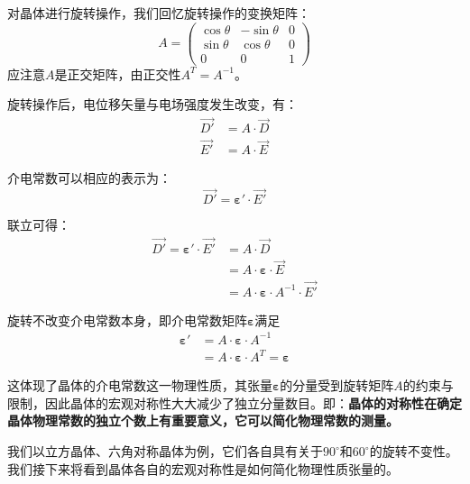     对晶体进行旋转操作，我们回忆旋转操作的变换矩阵：
    \[
    A=
    \left(
    \begin{array}{ccc}
        \cos\theta & -\sin\theta & 0 \\
        \sin\theta & \cos\theta  & 0 \\
        0          & 0           & 1 
    \end{array}
    \right)
    \]
    应注意$A$是正交矩阵，由正交性$A^T=A^{-1}$。

    旋转操作后，电位移矢量与电场强度发生改变，有：
    \begin{align*}
        \vec{D'} &= A \cdot \vec{D}\\
        \vec{E'} &= A \cdot \vec{E}
    \end{align*}

    介电常数可以相应的表示为：
    \[
    \vec{D'} = \boldsymbol{\varepsilon'} \cdot \vec{E'}
    \]

    联立可得：
    \begin{align*}
        \vec{D'}= \boldsymbol{\varepsilon'} \cdot \vec{E'}&= A \cdot \vec{D}\\
                                                          &= A \cdot \boldsymbol{\varepsilon} \cdot \vec{E}\\
                                                          &= A \cdot \boldsymbol{\varepsilon} \cdot A^{-1} \cdot \vec{E'}
    \end{align*}

    旋转不改变介电常数本身，即介电常数矩阵$\boldsymbol{\varepsilon}$满足
    \begin{align*}
        \boldsymbol{\varepsilon'} &= A \cdot \boldsymbol{\varepsilon} \cdot A^{-1}\\
                                  &= A \cdot \boldsymbol{\varepsilon} \cdot A^{T} = \boldsymbol{\varepsilon} 
    \end{align*}

    这体现了晶体的介电常数这一物理性质，其张量$\boldsymbol{\varepsilon}$的分量受到旋转矩阵$A$的约束与限制，因此晶体的宏观对称性大大减少了独立分量数目。即：\textbf{晶体的对称性在确定晶体物理常数的独立个数上有重要意义，它可以简化物理常数的测量。}

    我们以立方晶体、六角对称晶体为例，它们各自具有关于$90^{\circ}$和$60^{\circ}$的旋转不变性。我们接下来将看到晶体各自的宏观对称性是如何简化物理性质张量的。

